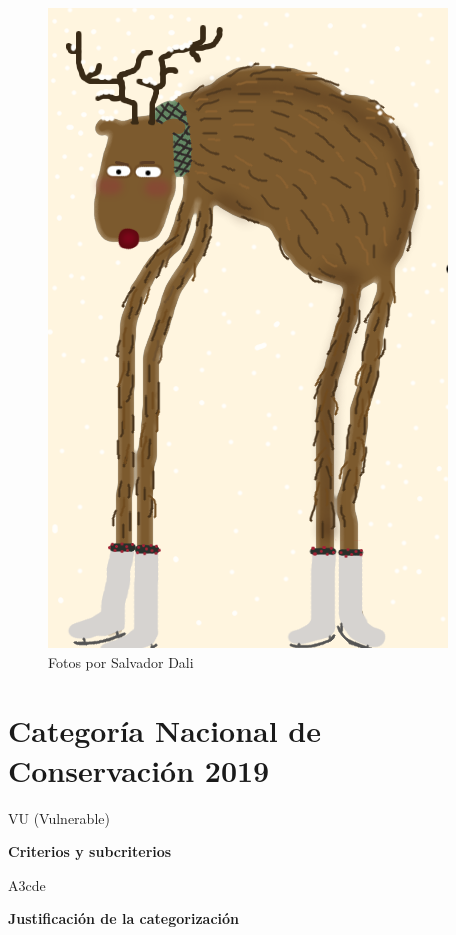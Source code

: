 \documentclass[
]{article}
\begin{document}
\begin{figure}[H]

{\centering \includegraphics[width=0.5\linewidth]{photos/Blastocerus dichotomus} 

}

\caption{Fotos por Salvador Dali}\label{fig:image}
\end{figure}

\hypertarget{categoruxeda-nacional-de-conservaciuxf3n-2019}{%
\section{\texorpdfstring{\textbf{Categoría Nacional de Conservación
2019}}{Categoría Nacional de Conservación 2019}}\label{categoruxeda-nacional-de-conservaciuxf3n-2019}}

VU (Vulnerable)

\textbf{Criterios y subcriterios}

A3cde

\textbf{Justificación de la categorización}
\end{document}
